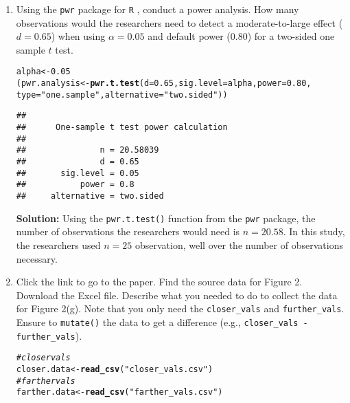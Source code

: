 \documentclass{article}\usepackage[]{graphicx}\usepackage[]{xcolor}
\makeatletter
\newcommand{\hlnum}[1]{\textcolor[rgb]{0.686,0.059,0.569}{#1}}%
\newcommand{\hlsng}[1]{\textcolor[rgb]{0.192,0.494,0.8}{#1}}%
\newcommand{\hlcom}[1]{\textcolor[rgb]{0.678,0.584,0.686}{\textit{#1}}}%
\newcommand{\hldef}[1]{\textcolor[rgb]{0.345,0.345,0.345}{#1}}%
\newcommand{\hlkwb}[1]{\textcolor[rgb]{0.69,0.353,0.396}{#1}}%
\newcommand{\hlkwc}[1]{\textcolor[rgb]{0.333,0.667,0.333}{#1}}%
\newcommand{\hlkwd}[1]{\textcolor[rgb]{0.737,0.353,0.396}{\textbf{#1}}}%
\newenvironment{kframe}{%
 \def\at@end@of@kframe{}%
 \ifinner\ifhmode%
  \def\at@end@of@kframe{\end{minipage}}%
  \begin{minipage}{\columnwidth}%
 \fi\fi%
 \def\FrameCommand##1{\hskip\@totalleftmargin \hskip-\fboxsep
 \colorbox{shadecolor}{##1}\hskip-\fboxsep
     \hskip-\linewidth \hskip-\@totalleftmargin \hskip\columnwidth}%
 \MakeFramed {\advance\hsize-\width
   \@totalleftmargin\z@ \linewidth\hsize
   \@setminipage}}%
 {\par\unskip\endMakeFramed%
 \at@end@of@kframe}
\newenvironment{knitrout}{}{} %
\makeatother
\begin{document}
\begin{enumerate}
\item Using the \texttt{pwr} package for \texttt{R} \citep{pwr},
conduct a power analysis. How many observations would the researchers 
need to detect a moderate-to-large effect ($d=0.65$) when using 
$\alpha=0.05$ and default power (0.80) for a two-sided one sample 
$t$ test. \\
\begin{knitrout}
\color{fgcolor}\begin{kframe}
\begin{alltt}
\hldef{alpha} \hlkwb{<-} \hlnum{0.05}
\hldef{(pwr.analysis} \hlkwb{<-} \hlkwd{pwr.t.test}\hldef{(}\hlkwc{d}\hldef{=}\hlnum{0.65}\hldef{,} \hlkwc{sig.level} \hldef{= alpha,} \hlkwc{power} \hldef{=} \hlnum{0.80}\hldef{,}
                            \hlkwc{type} \hldef{=} \hlsng{"one.sample"}\hldef{,} \hlkwc{alternative} \hldef{=} \hlsng{"two.sided"}\hldef{))}
\end{alltt}
\begin{verbatim}
## 
##      One-sample t test power calculation 
## 
##               n = 20.58039
##               d = 0.65
##       sig.level = 0.05
##           power = 0.8
##     alternative = two.sided
\end{verbatim}
\end{kframe}
\end{knitrout}
\textbf{Solution:} Using the \verb|pwr.t.test()| function from the \texttt{pwr} package, the number of observations the researchers would need is $n = 20.58$. In this study, the researchers used $n=25$ observation, well over the number of observations necessary.
\item Click the link to go to the paper. Find the source data for 
Figure 2. Download the Excel file. Describe what you needed to
do to collect the data for Figure 2(g). Note that you only need the 
\texttt{closer\_vals} and \texttt{further\_vals}. Ensure to 
\texttt{mutate()} the data to get a difference 
(e.g., \texttt{closer\_vals - further\_vals}).
\begin{knitrout}
\color{fgcolor}\begin{kframe}
\begin{alltt}
\hlcom{# closer vals}
\hldef{closer.data} \hlkwb{<-} \hlkwd{read_csv}\hldef{(}\hlsng{"closer_vals.csv"}\hldef{)}
\hlcom{# farther vals}
\hldef{farther.data} \hlkwb{<-} \hlkwd{read_csv}\hldef{(}\hlsng{"farther_vals.csv"}\hldef{)}


\end{alltt}
\end{kframe}
\end{knitrout}
\end{enumerate}
\end{document}
